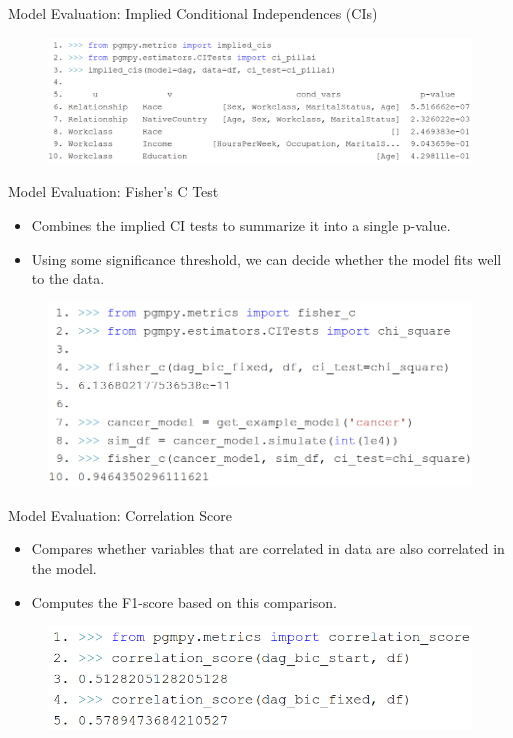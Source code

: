 \documentclass{beamer}
\begin{document}
\begin{frame}{Model Evaluation: Implied Conditional Independences (CIs)}
	\begin{figure}
		\includegraphics[scale=0.27]{imgs/implied_cis.png}
	\end{figure}
\end{frame}

\begin{frame}{Model Evaluation: Fisher's C Test}
	\begin{itemize}
		\item Combines the implied CI tests to summarize it into a single p-value.
		\item Using some significance threshold, we can decide whether the model fits well to the data.
	\end{itemize}
	\vspace{2em}
	\begin{figure}
		\centering
		\includegraphics[scale=0.3]{imgs/fisherc.png}
	\end{figure}
\end{frame}

\begin{frame}{Model Evaluation: Correlation Score}
	\begin{itemize}
		\item Compares whether variables that are correlated in data
			are also correlated in the model.
		\item Computes the F1-score based on this comparison.
	\end{itemize}
	\vspace{2em}
	\begin{figure}
		\centering
		\includegraphics[scale=0.3]{imgs/corr_score.png}
	\end{figure}

\end{frame}
\end{document}
